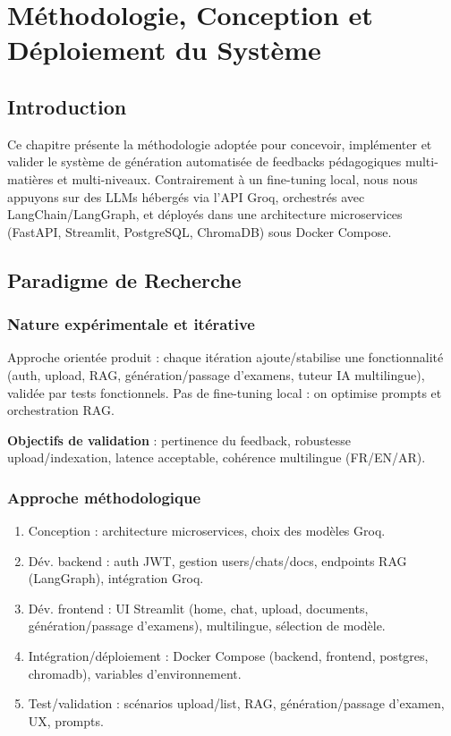 ﻿%

\chapter{Méthodologie, Conception et Déploiement du Système}

\section{Introduction}

Ce chapitre présente la méthodologie adoptée pour concevoir, implémenter et valider le système de génération automatisée de feedbacks pédagogiques multi-matières et multi-niveaux. Contrairement à un fine-tuning local, nous nous appuyons sur des LLMs hébergés via l’API Groq, orchestrés avec LangChain/LangGraph, et déployés dans une architecture microservices (FastAPI, Streamlit, PostgreSQL, ChromaDB) sous Docker Compose.

\section{Paradigme de Recherche}

\subsection{Nature expérimentale et itérative}

Approche orientée produit : chaque itération ajoute/stabilise une fonctionnalité (auth, upload, RAG, génération/passage d’examens, tuteur IA multilingue), validée par tests fonctionnels. Pas de fine-tuning local : on optimise prompts et orchestration RAG.

\textbf{Objectifs de validation} : pertinence du feedback, robustesse upload/indexation, latence acceptable, cohérence multilingue (FR/EN/AR).

\subsection{Approche méthodologique}

\begin{enumerate}
    \item Conception : architecture microservices, choix des modèles Groq.
    \item Dév. backend : auth JWT, gestion users/chats/docs, endpoints RAG (LangGraph), intégration Groq.
    \item Dév. frontend : UI Streamlit (home, chat, upload, documents, génération/passage d’examens), multilingue, sélection de modèle.
    \item Intégration/déploiement : Docker Compose (backend, frontend, postgres, chromadb), variables d’environnement.
    \item Test/validation : scénarios upload/list, RAG, génération/passage d’examen, UX, prompts.
\end{enumerate}

